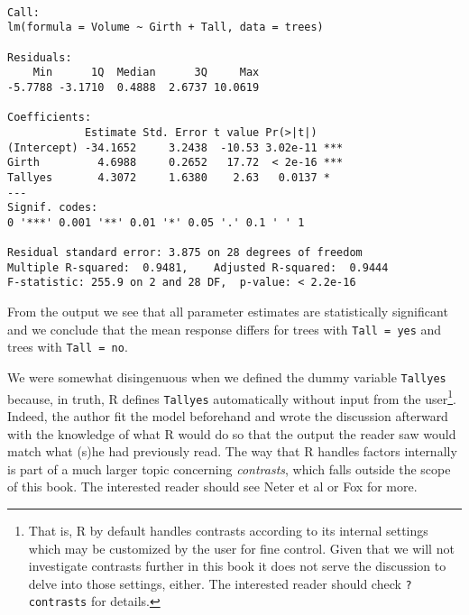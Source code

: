 \documentclass[]{book}
\let\rmarkdownfootnote\footnote%
\def\footnote{\protect\rmarkdownfootnote}
\numberwithin{equation}{chapter}
\numberwithin{figure}{chapter}
\theoremstyle{plain}
\theoremstyle{definition}
\theoremstyle{remark}
\theoremstyle{definition}
\theoremstyle{definition}
\theoremstyle{remark}
\let\BeginKnitrBlock\begin \let\EndKnitrBlock\end
\begin{document}
\begin{verbatim}

Call:
lm(formula = Volume ~ Girth + Tall, data = trees)

Residuals:
    Min      1Q  Median      3Q     Max 
-5.7788 -3.1710  0.4888  2.6737 10.0619 

Coefficients:
            Estimate Std. Error t value Pr(>|t|)    
(Intercept) -34.1652     3.2438  -10.53 3.02e-11 ***
Girth         4.6988     0.2652   17.72  < 2e-16 ***
Tallyes       4.3072     1.6380    2.63   0.0137 *  
---
Signif. codes:  
0 '***' 0.001 '**' 0.01 '*' 0.05 '.' 0.1 ' ' 1

Residual standard error: 3.875 on 28 degrees of freedom
Multiple R-squared:  0.9481,    Adjusted R-squared:  0.9444 
F-statistic: 255.9 on 2 and 28 DF,  p-value: < 2.2e-16
\end{verbatim}

From the output we see that all parameter estimates are statistically
significant and we conclude that the mean response differs for trees
with \texttt{Tall\ =\ yes} and trees with \texttt{Tall\ =\ no}.

\bigskip

\BeginKnitrBlock{rem}
We were somewhat disingenuous when we defined the dummy variable
\texttt{Tallyes} because, in truth, R defines \texttt{Tallyes}
automatically without input from the user\footnote{That is, R by default
  handles contrasts according to its internal settings which may be
  customized by the user for fine control. Given that we will not
  investigate contrasts further in this book it does not serve the
  discussion to delve into those settings, either. The interested reader
  should check \texttt{?contrasts} for details.}. Indeed, the author fit
the model beforehand and wrote the discussion afterward with the
knowledge of what R would do so that the output the reader saw would
match what (s)he had previously read. The way that R handles factors
internally is part of a much larger topic concerning \emph{contrasts},
which falls outside the scope of this book. The interested reader should
see Neter et al \autocite{Neter1996} or Fox \autocite{Fox1997} for more.
\EndKnitrBlock{rem}

\bigskip
\end{document}
